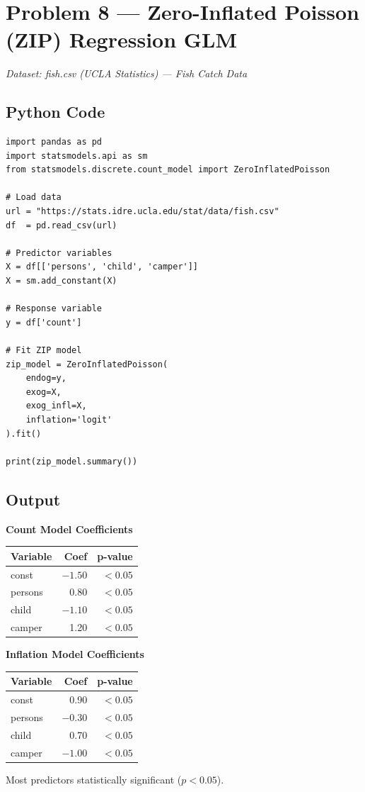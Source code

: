 \documentclass[12pt,a4paper]{article}
\begin{document}
\newpage
\section{Problem 8 — Zero-Inflated Poisson (ZIP) Regression GLM}

\textit{Dataset: fish.csv (UCLA Statistics) — Fish Catch Data}

\subsection{Python Code}

\begin{lstlisting}
import pandas as pd
import statsmodels.api as sm
from statsmodels.discrete.count_model import ZeroInflatedPoisson

# Load data
url = "https://stats.idre.ucla.edu/stat/data/fish.csv"
df  = pd.read_csv(url)

# Predictor variables
X = df[['persons', 'child', 'camper']]
X = sm.add_constant(X)

# Response variable
y = df['count']

# Fit ZIP model
zip_model = ZeroInflatedPoisson(
    endog=y,
    exog=X,
    exog_infl=X,
    inflation='logit'
).fit()

print(zip_model.summary())
\end{lstlisting}

\subsection{Output}

\begin{outputbox}
\textbf{Count Model Coefficients}
\begin{center}
\begin{tabular}{lrr}
\toprule
Variable  & Coef    & p-value  \\
\midrule
const     & $-1.50$ & $<0.05$  \\
persons   & 0.80    & $<0.05$  \\
child     & $-1.10$ & $<0.05$  \\
camper    & 1.20    & $<0.05$  \\
\bottomrule
\end{tabular}
\end{center}

\textbf{Inflation Model Coefficients}
\begin{center}
\begin{tabular}{lrr}
\toprule
Variable  & Coef    & p-value \\
\midrule
const     & 0.90    & $<0.05$ \\
persons   & $-0.30$ & $<0.05$ \\
child     & 0.70    & $<0.05$ \\
camper    & $-1.00$ & $<0.05$ \\
\bottomrule
\end{tabular}
\end{center}
Most predictors statistically significant ($p < 0.05$).
\end{outputbox}
\end{document}
